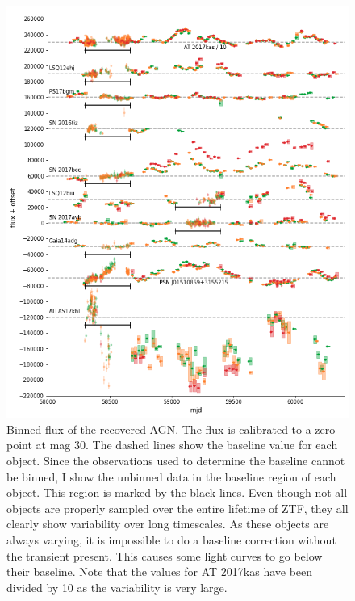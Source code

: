 \documentclass[a4paper,oneside,12pt, class=Latex/Classes/PhDthesisPSnPDF, crop=false]{standalone}
\begin{document}
\begin{figure}[h!]
    \centering
    \includegraphics[width=\textwidth]{../Images/chapter_4/non-transients_AGN.png}
    \caption[Binned flux of the recoverd AGN.]{Binned flux of the recovered AGN. The flux is calibrated to a zero point at mag 30. The dashed lines show the baseline value for each object. Since the observations used to determine the baseline cannot be binned, I show the unbinned data in the baseline region of each object. This region is marked by the black lines. Even though not all objects are properly sampled over the entire lifetime of ZTF, they all clearly show variability over long timescales. As these objects are always varying, it is impossible to do a baseline correction without the transient present. This causes some light curves to go below their baseline. Note that the values for AT 2017kas have been divided by 10 as the variability is very large.}
    \label{non-transients_AGN}
\end{figure}
\end{document}
